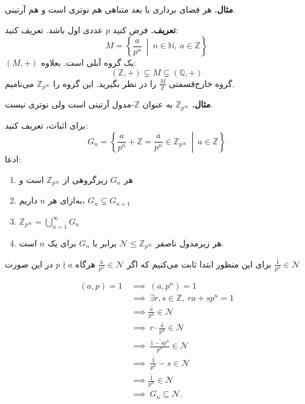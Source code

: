 \hrulefill


\textbf{مثال.}  هر فضای برداری با بعد متناهی هم نوتری است و هم آرتینی.

\hrulefill


\textbf{تعریف.} فرض کنید $p$ عددی اول باشد. تعریف کنید:
\[
    M = \left\{ \frac{a}{p^n} \ \middle| \ n \in \mathbb{N},\ a \in \mathbb{Z} \right\}
\]
$(M, +)$ یک گروه آبلی است.  بعلاوه:
\[
    (\mathbb{Z}, +) \subsetneq M \subsetneq (\mathbb{Q}, +)
\]
گروه خارج‌قسمتی $\frac{M}{\mathbb{Z}}$ را در نظر بگیرید. این گروه را $\mathbb{Z}_{p^\infty}$ می‌نامیم.

\textbf{مثال.} $\mathbb{Z}_{p^\infty}$ به عنوان $\mathbb{Z}$-مدول آرتینی است ولی نوتری نیست.

برای اثبات، تعریف کنید:
\[
    G_n = \left\{ \frac{a}{p^n} + \mathbb{Z} = \overline{\frac{a}{p^n}} \in \mathbb{Z}_{p^\infty} \ \middle| \ a \in \mathbb{Z} \right\}
\]
ادعا:
\begin{enumerate}
    \item هر $G_n$ زیرگروهی از $\mathbb{Z}_{p^\infty}$ است و
    \item به‌ازای هر ‌‌\(‌n\) داریم، \(G_n \subsetneq G_{n+1} \)
    \item \(\mathbb{Z}_{p^\infty} = \bigcup_{n=1}^\infty G_n\)
    \item  هر زیرمدول ناصفر $\mathcal{N} \leqslant \mathbb{Z}_{p^\infty}$ برابر با $G_n$ برای یک $n$ است.
\end{enumerate}

برای این منظور ابتدا ثابت می‌کنیم که اگر
\(\overline{\frac{a}{p^n}} \in \mathcal{N}\)
هرگاه
\(p \nmid a\)
در این صورت
\(\overline{\frac{1}{p^n}} \in \mathcal{N}\)

\[
    \begin{aligned}
        (a, p) = 1 \  & \implies\ (a, p^n) = 1 \                                   \\
                      & \implies\ \exists r, s \in \mathbb{Z}, \ ra + sp^n = 1     \\
                      & \implies \overline{\frac{a}{p^n}} \in \mathcal{N}          \\
                      & \implies\ r \cdot \overline{\frac{a}{p^n}} \in \mathcal{N} \\
                      & \implies\ \overline{\frac{1 - sp^n}{p^n}} \in \mathcal{N}  \\
                      & \implies\ \overline{\frac{1}{p^n}} - s \in \mathcal{N}     \\
                      & \implies \overline{\frac{1}{p^n}} \in \mathcal{N}          \\
                      & \implies\ G_n \subseteq \mathcal{N}.
    \end{aligned}
\]

